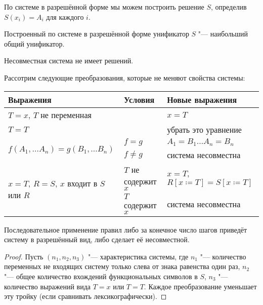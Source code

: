 По системе в разрешённой форме мы можем построить решение $S$, определив $S(x_i) = A_i$ для каждого $i$.

\begin{statement}
    Построенный по системе в разрешённой форме унификатор $S$ "--- наибольший общий унификатор.
\end{statement}

\begin{statement}
    Несовместная система не имеет решений.
\end{statement}

Рассотрим следующие преобразования, которые не меняют свойства системы:
\begin{center}
\begin{tabular}{l l l} \toprule
    Выражения                         & Условия             & Новые выражения \\ \midrule
    $T=x$, $T$ не переменная          &                     & $x=T$ \\ \midrule
    $T=T$                             &                     & убрать это уравнение \\ \midrule
    \multirow{2}{*}[-\aboverulesep]{$f(A_1, \ldots A_n) = g(B_1, \ldots B_n)$}
                                      & $f=g$               & $ A_1 = B_1 \ldots A_n = B_n$ \\ \cmidrule{2-3}
                                      & $f \neq g$          & система несовместна \\ \midrule
    \multirow{2}{*}[-\aboverulesep]{$x=T$, $R=S$, $x$ входит в $S$ или $R$}
                                      & $T$ не содержит $x$ & $x=T$,$R\left[x\coloneqq T\right]=S\left[x\coloneqq T\right]$\\ \cmidrule{2-3}
                                      & $T$ содержит $x$    & система несовместна \\ \bottomrule
\end{tabular}
\end{center}

\begin{statement}
    Последовательное применение правил либо за конечное число шагов приведёт систему в разрешённый вид, либо сделает её несовместной.
\end{statement}

\begin{proof}
    Пусть $(n_1, n_2, n_3)$ "--- характеристика системы, где
    $n_1$ "--- количество переменных не входящих систему только слева от знака равенства один раз,
    $n_2$ "--- общее количество вхождений функциональных символов в $S$,
    $n_3$ "--- количество выражений вида $T=x$ или $T=T$.
    Каждое преобразование уменьшает эту тройку (если сравнивать лексикографически).
\end{proof}

